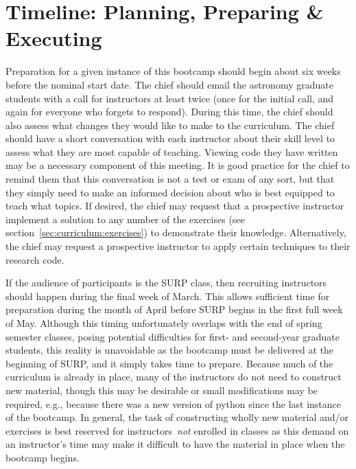 
\section{Timeline: Planning, Preparing \& Executing}
\label{sec:timeline}
\noindent
Preparation for a given instance of this bootcamp should begin about six weeks
before the nominal start date.
The chief should email the astronomy graduate students with a call for
instructors at least twice (once for the initial call, and again for everyone
who forgets to respond).
During this time, the chief should also assess what changes they would like to
make to the curriculum.
The chief should have a short conversation with each instructor about their
skill level to assess what they are most capable of teaching.
Viewing code they have written may be a necessary component of this meeting.
It is good practice for the chief to remind them that this conversation is not
a test or exam of any sort, but that they simply need to make an informed
decision about who is best equipped to teach what topics.
If desired, the chief may request that a prospective instructor implement a
solution to any number of the exercises (see
section~\ref{sec:curriculum:exercises}) to demonstrate their knowledge.
Alternatively, the chief may request a prospective instructor to apply certain
techniques to their research code.
\par
If the audience of participants is the SURP class, then recruiting instructors
should happen during the final week of March.
This allows sufficient time for preparation during the month of April before
SURP begins in the first full week of May.
Although this timing unfortunately overlaps with the end of spring semester
classes, posing potential difficulties for first- and second-year graduate
students, this reality is unavoidable as the bootcamp must be delivered at the
beginning of SURP, and it simply takes time to prepare.
Because much of the curriculum is already in place, many of the instructors do
not need to construct new material, though this may be desirable or small
modifications may be required, e.g., because there was a new version of python
since the last instance of the bootcamp.
In general, the task of constructing wholly new material and/or exercises is
best reserved for instructors~\textit{not} enrolled in classes as this demand
on an instructor's time may make it difficult to have the material in place
when the bootcamp begins.

